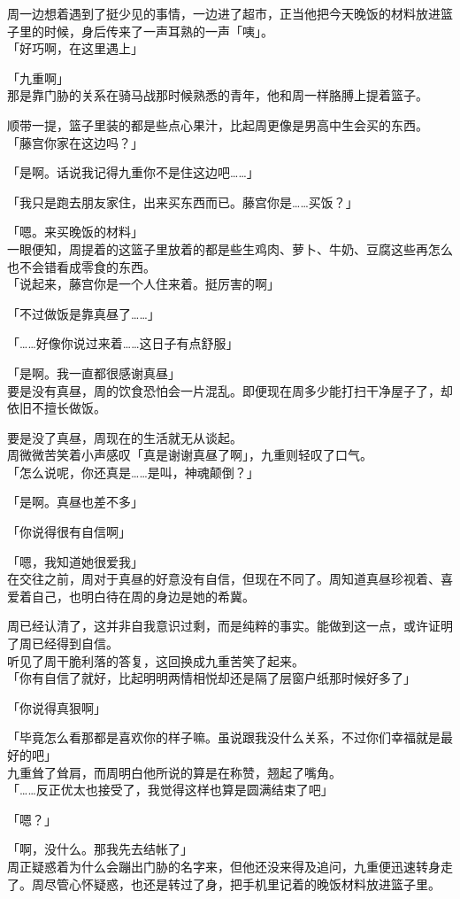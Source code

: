 周一边想着遇到了挺少见的事情，一边进了超市，正当他把今天晚饭的材料放进篮子里的时候，身后传来了一声耳熟的一声「咦」。\\

「好巧啊，在这里遇上」

「九重啊」\\

那是靠门胁的关系在骑马战那时候熟悉的青年，他和周一样胳膊上提着篮子。

顺带一提，篮子里装的都是些点心果汁，比起周更像是男高中生会买的东西。\\

「藤宫你家在这边吗？」

「是啊。话说我记得九重你不是住这边吧……」

「我只是跑去朋友家住，出来买东西而已。藤宫你是……买饭？」

「嗯。来买晚饭的材料」\\

一眼便知，周提着的这篮子里放着的都是些生鸡肉、萝卜、牛奶、豆腐这些再怎么也不会错看成零食的东西。\\

「说起来，藤宫你是一个人住来着。挺厉害的啊」

「不过做饭是靠真昼了……」

「……好像你说过来着……这日子有点舒服」

「是啊。我一直都很感谢真昼」\\

要是没有真昼，周的饮食恐怕会一片混乱。即便现在周多少能打扫干净屋子了，却依旧不擅长做饭。

要是没了真昼，周现在的生活就无从谈起。\\

周微微苦笑着小声感叹「真是谢谢真昼了啊」，九重则轻叹了口气。\\

「怎么说呢，你还真是……是叫，神魂颠倒？」

「是啊。真昼也差不多」

「你说得很有自信啊」

「嗯，我知道她很爱我」\\

在交往之前，周对于真昼的好意没有自信，但现在不同了。周知道真昼珍视着、喜爱着自己，也明白待在周的身边是她的希冀。

周已经认清了，这并非自我意识过剩，而是纯粹的事实。能做到这一点，或许证明了周已经得到自信。\\

听见了周干脆利落的答复，这回换成九重苦笑了起来。\\

「你有自信了就好，比起明明两情相悦却还是隔了层窗户纸那时候好多了」

「你说得真狠啊」

「毕竟怎么看那都是喜欢你的样子嘛。虽说跟我没什么关系，不过你们幸福就是最好的吧」\\

九重耸了耸肩，而周明白他所说的算是在称赞，翘起了嘴角。\\

「……反正优太也接受了，我觉得这样也算是圆满结束了吧」

「嗯？」

「啊，没什么。那我先去结帐了」\\

周正疑惑着为什么会蹦出门胁的名字来，但他还没来得及追问，九重便迅速转身走了。周尽管心怀疑惑，也还是转过了身，把手机里记着的晚饭材料放进篮子里。
